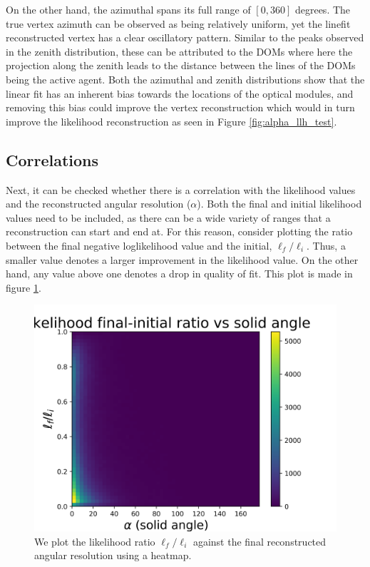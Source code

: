 On the other hand, the azimuthal spans its full range of $[0, 360]$ degrees. The true vertex azimuth can be observed as being relatively uniform, yet the linefit reconstructed vertex has a clear oscillatory pattern. Similar to the peaks observed in the zenith distribution, these can be attributed to the DOMs where here the projection along the zenith leads to the distance between the lines of the DOMs being the active agent. Both the azimuthal and zenith distributions show that the linear fit has an inherent bias towards the locations of the optical modules, and removing this bias could improve the vertex reconstruction which would in turn improve the likelihood reconstruction as seen in Figure \ref{fig:alpha_llh_test}.

\subsection{Correlations}

Next, it can be checked whether there is a correlation with the likelihood values and the reconstructed angular resolution ($\alpha$). Both the final and initial likelihood values need to be included, as there can be a wide variety of ranges that a reconstruction can start and end at. For this reason, consider plotting the ratio between the final negative loglikelihood value and the initial, $\ell_{f}/\ell_{i}$. Thus, a smaller value denotes a larger improvement in the likelihood value. On the other hand, any value above one denotes a drop in quality of fit. This plot is made in figure \ref{fig:alpha_llhratio_comp}.

\begin{figure}[H]
  \centering
  \includegraphics[width=12cm]{./Figures/reco_plots/alpha_dist_vs_llhratio_heat.png}
  \caption{We plot the likelihood ratio $\ell_{f}/\ell_{i}$ against the final reconstructed angular resolution using a heatmap. }
  \label{fig:alpha_llhratio_comp}
\end{figure}

